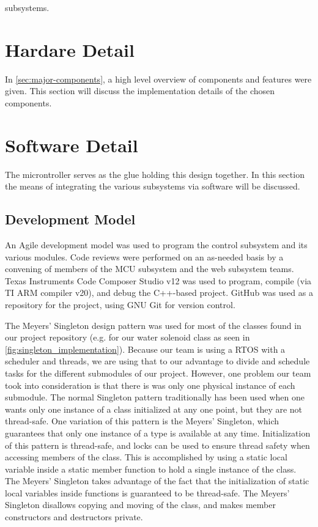 \documentclass[journal]{IEEEtran}
\begin{document}
subsystems. 
\section{Hardare Detail}
In \autoref{sec:major-components}, a high level overview of components and features were given. This
section will discuss the implementation details of the chosen components.
\section{Software Detail}
The microntroller serves as the glue holding this design together. In this section the means of
integrating the various subsystems via software will be discussed.
\subsection{Development Model}
An Agile development model was used to program the control subsystem and its various modules. Code reviews were performed on an as-needed basis by a convening of members of the MCU subsystem and the web subsystem teams. Texas Instruments Code Composer Studio v12 was used to program, compile (via TI ARM compiler v20), and debug the C++-based project. GitHub was used as a repository for the project, using GNU Git for version control.

The Meyers' Singleton design pattern was used for most of the classes found in our project repository (e.g. for our water solenoid class as seen in \ref{fig:singleton_implementation}). Because our team is using a RTOS with a scheduler and threads, we are using that to our advantage to divide and schedule tasks for the different submodules of our project. However, one problem our team took into consideration is that there is was only one physical instance of each submodule. The normal Singleton pattern traditionally has been used when one wants only one instance of a class initialized at any one point, but they are not thread-safe. One variation of this pattern is the Meyers' Singleton, which guarantees that only one instance of a type is available at any time. Initialization of this pattern is thread-safe, and locks can be used to ensure thread safety when accessing members of the class. This is accomplished by using a static local variable inside a static member function to hold a single instance of the class. The Meyers' Singleton takes advantage of the fact that the initialization of static local variables inside functions is guaranteed to be thread-safe. The Meyers' Singleton disallows copying and moving of the class, and makes member constructors and destructors private\cite{Meyers}.
\end{document}
